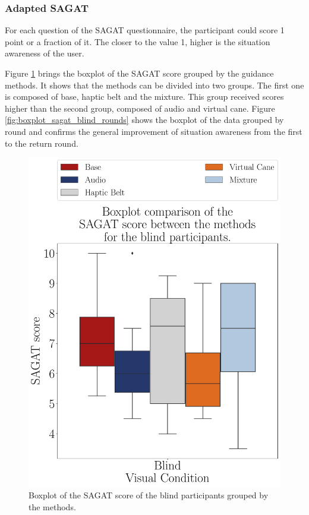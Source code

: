 \subsubsection{Adapted SAGAT}
\label{subsubsec:results_adapted_sagat_1}

For each question of the SAGAT questionnaire, the participant could score 1 point or a fraction of it. The closer to the value 1, higher is the situation awareness of the user. 

Figure \ref{fig:boxplot_sagat_blind_scene} brings the boxplot of the SAGAT score grouped by the guidance methods. It shows that the methods can be divided into two groups. The first one is composed of base, haptic belt and the mixture. This group received scores higher than the second group, composed of audio and virtual cane. Figure \ref{fig:boxplot_sagat_blind_rounds} shows the boxplot of the data grouped by round and confirms the general improvement of situation awareness from the first to the return round. 

\begin{figure}[!htb]
    \centering
    \includegraphics[width = 0.75\linewidth]{3 - Resultados/Figuras/boxplot_sagat_blind_scene.pdf}
    \caption{Boxplot of the SAGAT score of the blind participants grouped by the methods.}
    \label{fig:boxplot_sagat_blind_scene}
\end{figure}

